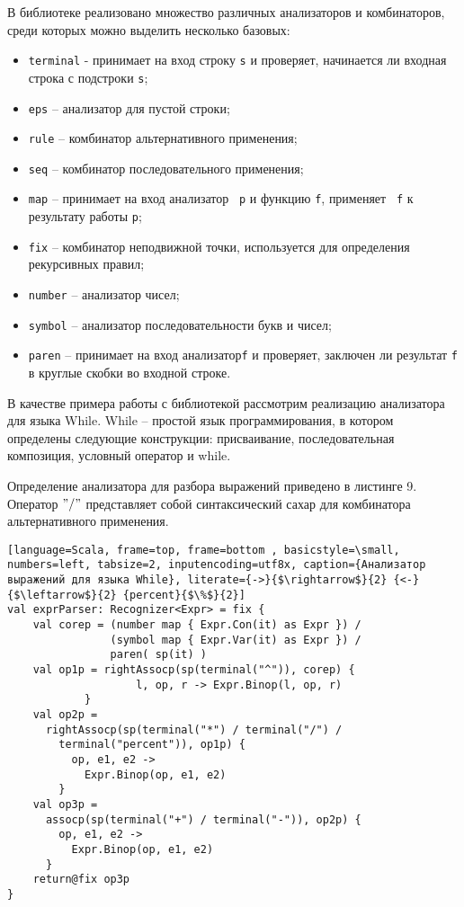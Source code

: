   В библиотеке реализовано множество различных анализаторов и комбинаторов, среди которых можно выделить несколько базовых:
  \begin{itemize}
      \item \lstinline[language=Scala]{terminal} - принимает на вход строку \lstinline[language=Scala]{s} и проверяет, начинается ли входная строка с подстроки \lstinline[language=Scala]{s};
      \item \lstinline[language=Scala]{eps} -- анализатор для пустой строки;
      \item \lstinline[language=Scala]{rule} -- комбинатор альтернативного применения;
      \item \lstinline[language=Scala]{seq} -- комбинатор последовательного применения;
      \item \lstinline[language=Scala]{map} -- принимает на вход анализатор \lstinline[language=Scala]{ p} и функцию \lstinline[language=Scala]{f}, применяет \lstinline[language=Scala]{ f} к результату работы \lstinline[language=Scala]{p};
      \item \lstinline[language=Scala]{fix} -- комбинатор неподвижной точки, используется для определения рекурсивных правил;
      \item \lstinline[language=Scala]{number} -- анализатор чисел;
      \item \lstinline[language=Scala]{symbol} -- анализатор последовательности букв и чисел;
      \item \lstinline[language=Scala]{paren} -- принимает на вход анализатор\lstinline[language=Scala]{f} и проверяет, заключен ли результат \lstinline[language=Scala]{f} в круглые скобки во входной строке.
  \end{itemize}
  
   В качестве примера работы с библиотекой рассмотрим реализацию анализатора для языка While. While -- простой язык программирования, в котором определены следующие конструкции: присваивание, последовательная композиция, условный оператор и while.
   
   Определение анализатора для разбора выражений приведено в листинге 9. Оператор $"/"$ представляет собой синтаксический сахар для комбинатора альтернативного применения. 
  
  \begin{lstlisting}[language=Scala, frame=top, frame=bottom , basicstyle=\small, numbers=left, tabsize=2, inputencoding=utf8x, caption={Анализатор выражений для языка While}, literate={->}{$\rightarrow$}{2} {<-}{$\leftarrow$}{2} {percent}{$\%$}{2}]
val exprParser: Recognizer<Expr> = fix {
    val corep = (number map { Expr.Con(it) as Expr }) /
                (symbol map { Expr.Var(it) as Expr }) /
                paren( sp(it) )
    val op1p = rightAssocp(sp(terminal("^")), corep) {
                    l, op, r -> Expr.Binop(l, op, r) 
            }
    val op2p =
      rightAssocp(sp(terminal("*") / terminal("/") / 
        terminal("percent")), op1p) {
          op, e1, e2 ->
            Expr.Binop(op, e1, e2)
        }
    val op3p =
      assocp(sp(terminal("+") / terminal("-")), op2p) {
        op, e1, e2 ->
          Expr.Binop(op, e1, e2)
      }
    return@fix op3p
}
  \end{lstlisting}
  
